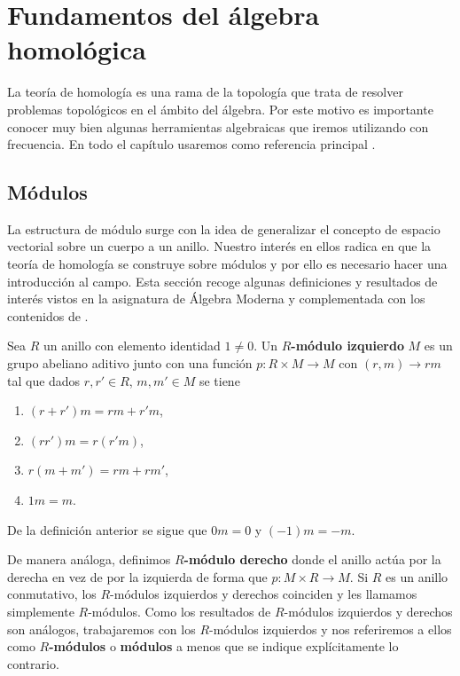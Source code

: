 
\chapter{Fundamentos del álgebra homológica}
\label{chapter:alg-fundamentals}

La teoría de homología es una rama de la topología que trata de resolver problemas
topológicos en el ámbito del álgebra. Por este motivo es importante conocer muy
bien algunas herramientas algebraicas que iremos utilizando con frecuencia. En todo
el capítulo usaremos como referencia principal \cite{maclane2012homology}.

\section{Módulos}

La estructura de módulo surge con la idea de generalizar el concepto de espacio
vectorial sobre un cuerpo a un anillo. Nuestro interés en ellos radica en que la
teoría de homología se construye sobre módulos y por ello es necesario hacer una
introducción al campo. Esta sección recoge algunas definiciones y resultados de
interés vistos en la asignatura de Álgebra Moderna y complementada con los
contenidos de \cite{dummit2004abstract}.

\begin{definicion}
	Sea $R$ un anillo con elemento identidad $1 \neq 0$. Un \textbf{$R$-módulo
		izquierdo} $M$ es un grupo abeliano aditivo junto con una función $p: R \times
	M \rightarrow M$ con $(r, m) \to rm$ tal que dados $r,r' \in R$, $m,m' \in M$
	se tiene
	\begin{enumerate}
		\item $(r+r') m = r m + r' m$,
		
		\item $(rr') m = r (r' m)$,
		
		\item $r(m+m') = rm + rm'$,
		
		\item $1m = m$.
	\end{enumerate}
\end{definicion}

De la definición anterior se sigue que $0m = 0$ y $(-1)m = -m$.

De manera análoga, definimos \textbf{$R$-módulo derecho} donde el anillo actúa por
la derecha en vez de por la izquierda de forma que $p: M \times R \rightarrow M$.
Si $R$ es un anillo conmutativo, los $R$-módulos izquierdos y derechos coinciden
y les llamamos simplemente $R$-módulos. Como los resultados de $R$-módulos
izquierdos y derechos son análogos, trabajaremos con los $R$-módulos izquierdos y
nos referiremos a ellos como \textbf{$R$-módulos} o \textbf{módulos} a menos que
se indique explícitamente lo contrario.

